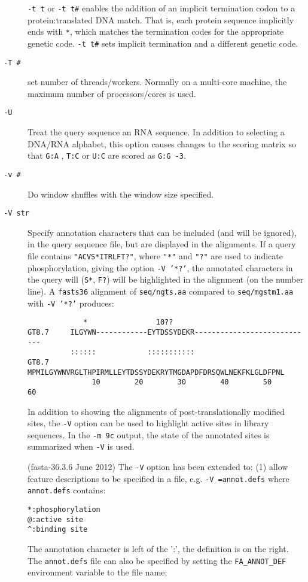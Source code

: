 \documentclass[11pt]{article}
\begin{document}
\begin{description}
\texttt{-t t} or \texttt{-t t\#} enables the addition of
an implicit termination codon to a protein:translated DNA match.  That
is, each protein sequence implicitly ends with \texttt{*}, which
matches the termination codes for the appropriate genetic code.
\texttt{-t t\#} sets implicit termination and a different genetic
code.
\item[\texttt{-T \#}]
set number of threads/workers.  Normally on a multi-core machine, the maximum
number of processors/cores is used.
\item[\texttt{-U}]
Treat the query sequence an RNA sequence.  In addition to selecting a
DNA/RNA alphabet, this option causes changes to the scoring matrix so
that \texttt{G:A} , \texttt{T:C} or \texttt{U:C} are scored as \mbox{\texttt{G:G -3}}.
\item[\texttt{-v \#}]
Do window shuffles with the window size specified.
\item[\texttt{-V str}] Specify annotation characters that can be
  included (and will be ignored), in the query sequence file, but are
  displayed in the alignments.  If a query file contains
  \texttt{"ACVS*ITRLFT?"}, where \texttt{"*"} and \texttt{"?"}  are
  used to indicate phosphorylation, giving the option \mbox{\texttt{-V
      '*?'}}, the annotated characters in the query will (\texttt{S*},
  \texttt{F?}) will be highlighted in the alignment (on the number
  line). A \texttt{fasts36} alignment of \texttt{seq/ngts.aa} compared
  to \texttt{seq/mgstm1.aa} with \texttt{-V '*?'} produces:
\begin{footnotesize}
\begin{verbatim}
             *                10??                                 
GT8.7     ILGYWN------------EYTDSSYDEKR----------------------------
          ::::::            :::::::::::                            
GT8.7  MPMILGYWNVRGLTHPIRMLLEYTDSSYDEKRYTMGDAPDFDRSQWLNEKFKLGLDFPNL
               10        20        30        40        50        60
\end{verbatim}
\end{footnotesize}
In addition to showing the alignments of post-translationally modified
sites, the \texttt{-V} option can be used to highlight active sites in
library sequences. In the \texttt{-m 9c} output, the state of the
annotated sites is summarized when \texttt{-V} is used.

(fasta-36.3.6 June 2012) The \texttt{-V} option has been extended to:
(1) allow feature descriptions to be specified in a file,
e.g. \texttt{-V =annot.defs} where \texttt{annot.defs} contains:
\begin{footnotesize}
\begin{verbatim}
*:phosphorylation
@:active site
^:binding site
\end{verbatim}
\end{footnotesize}
The annotation character is left of the  ':', the definition is on the
right.  The \texttt{annot.defs} file can also be specified by setting
the \texttt{FA\_ANNOT\_DEF} environment variable to the file name;


\end{description}
\end{document}
